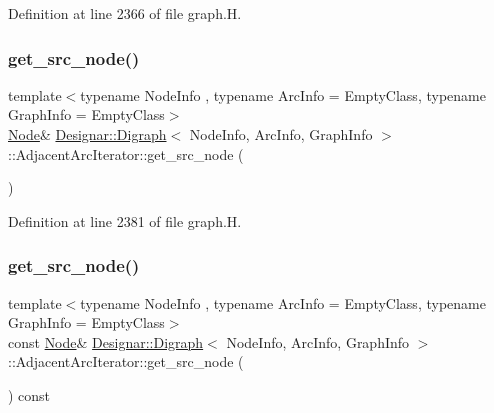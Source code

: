 Definition at line 2366 of file graph.\+H.

\mbox{\label{class_designar_1_1_digraph_1_1_adjacent_arc_iterator_a72e125198f4cea2ab0ac1213c1cbc1e4}} 
\subsubsection{\texorpdfstring{get\+\_\+src\+\_\+node()}{get\_src\_node()}\hspace{0.1cm}{\footnotesize\ttfamily [1/2]}}
{\footnotesize\ttfamily template$<$typename Node\+Info , typename Arc\+Info  = Empty\+Class, typename Graph\+Info  = Empty\+Class$>$ \\
\hyperlink{class_designar_1_1_digraph_a4dc921c41a480b7946a04170e997d8ae}{Node}\& \hyperlink{class_designar_1_1_digraph}{Designar\+::\+Digraph}$<$ Node\+Info, Arc\+Info, Graph\+Info $>$\+::Adjacent\+Arc\+Iterator\+::get\+\_\+src\+\_\+node (\begin{DoxyParamCaption}{ }\end{DoxyParamCaption})\hspace{0.3cm}{\ttfamily [inline]}}



Definition at line 2381 of file graph.\+H.

\mbox{\label{class_designar_1_1_digraph_1_1_adjacent_arc_iterator_a09c51f5124610cd6e5360dc7039b4639}} 
\subsubsection{\texorpdfstring{get\+\_\+src\+\_\+node()}{get\_src\_node()}\hspace{0.1cm}{\footnotesize\ttfamily [2/2]}}
{\footnotesize\ttfamily template$<$typename Node\+Info , typename Arc\+Info  = Empty\+Class, typename Graph\+Info  = Empty\+Class$>$ \\
const \hyperlink{class_designar_1_1_digraph_a4dc921c41a480b7946a04170e997d8ae}{Node}\& \hyperlink{class_designar_1_1_digraph}{Designar\+::\+Digraph}$<$ Node\+Info, Arc\+Info, Graph\+Info $>$\+::Adjacent\+Arc\+Iterator\+::get\+\_\+src\+\_\+node (\begin{DoxyParamCaption}{ }\end{DoxyParamCaption}) const\hspace{0.3cm}{\ttfamily [inline]}}



